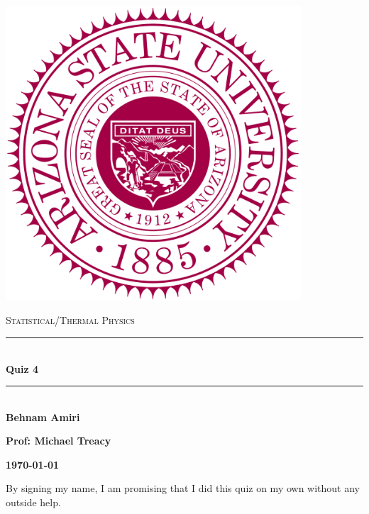 \documentclass[fleqn]{article}
\begin{document}
  \begin{titlepage}

    \newcommand{\HRule}{\rule{\linewidth}{0.5mm}}

    \center

    \begin{center}
      \includegraphics[height=11cm, width=11cm]{asu.png}
    \end{center}

    \vline

    \textsc{\LARGE Statistical/Thermal Physics}\\[1.5cm]

    \HRule \\[0.5cm]
    { \huge \bfseries Quiz 4}\\[0.4cm] 
    \HRule \\[1.0cm]

    \textbf{Behnam Amiri}

    \bigbreak

    \textbf{Prof: Michael Treacy}

    \bigbreak

    \textbf{{\large \today}\\[2cm]}

    \vfill

  \end{titlepage}

  By signing my name, I am promising that I did this quiz on my own without any outside help.

  \vspace{0.5cm}
\end{document}
